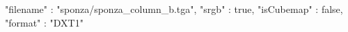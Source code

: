 { 
	"filename" : "sponza/sponza_column_b.tga", 
	"srgb" : true,
	"isCubemap" : false,
	"format" : "DXT1"
}